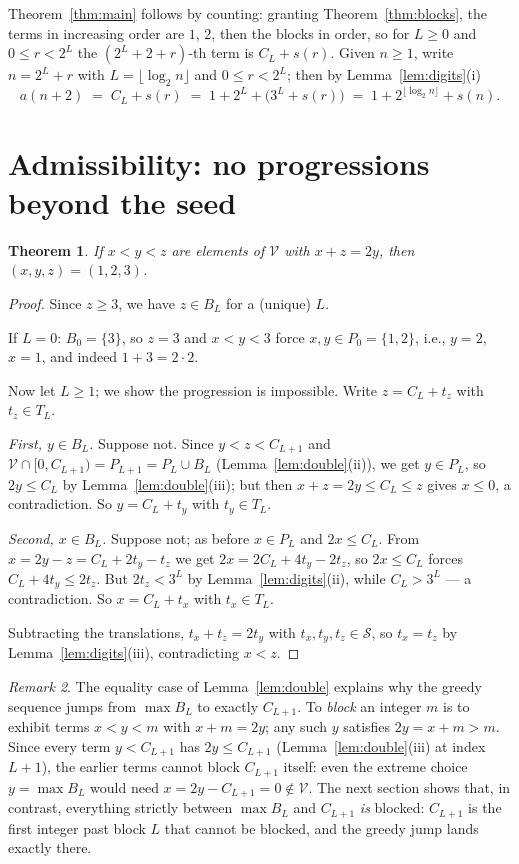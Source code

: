 \documentclass[12pt]{article}
\theoremstyle{plain}
\newtheorem{theorem}{Theorem}
\theoremstyle{definition}
\theoremstyle{remark}
\newtheorem{remark}[theorem]{Remark}
\newcommand{\V}{\mathcal{V}}
\newcommand{\Sd}{\mathcal{S}}
\begin{document}
Theorem~\ref{thm:main} follows by counting: granting
Theorem~\ref{thm:blocks}, the terms in increasing order are $1$,
$2$, then the blocks in order, so for $L\geq 0$ and
$0\leq r<2^L$ the $(2^L+2+r)$-th term is $C_L+s(r)$.  Given
$n\geq 1$, write $n=2^L+r$ with $L=\lfloor\log_2 n\rfloor$ and
$0\leq r<2^L$; then by Lemma~\ref{lem:digits}(i)
\[
a(n+2) \;=\; C_L+s(r) \;=\; 1+2^L+\bigl(3^L+s(r)\bigr)
\;=\; 1+2^{\lfloor\log_2 n\rfloor}+s(n).
\]

\section{Admissibility: no progressions beyond the seed}
\label{sec:admissible}

\begin{theorem}\label{thm:admissible}
If $x<y<z$ are elements of $\V$ with $x+z=2y$, then
$(x,y,z)=(1,2,3)$.
\end{theorem}

\begin{proof}
Since $z\geq 3$, we have $z\in B_L$ for a (unique) $L$.

If $L=0$: $B_0=\{3\}$, so $z=3$ and $x<y<3$ force
$x,y\in P_0=\{1,2\}$, i.e., $y=2$, $x=1$, and indeed
$1+3=2\cdot 2$.

Now let $L\geq 1$; we show the progression is impossible.  Write
$z=C_L+t_z$ with $t_z\in T_L$.

\emph{First, $y\in B_L$.}  Suppose not.  Since $y<z<C_{L+1}$ and
$\V\cap[0,C_{L+1})=P_{L+1}=P_L\cup B_L$
(Lemma~\ref{lem:double}(ii)), we get $y\in P_L$, so
$2y\leq C_L$ by Lemma~\ref{lem:double}(iii); but then
$x+z=2y\leq C_L\leq z$ gives $x\leq 0$, a contradiction.  So
$y=C_L+t_y$ with $t_y\in T_L$.

\emph{Second, $x\in B_L$.}  Suppose not; as before $x\in P_L$
and $2x\leq C_L$.  From $x=2y-z=C_L+2t_y-t_z$ we get
$2x=2C_L+4t_y-2t_z$, so $2x\leq C_L$ forces
$C_L+4t_y\leq 2t_z$.  But $2t_z<3^L$ by
Lemma~\ref{lem:digits}(ii), while $C_L>3^L$ --- a contradiction.
So $x=C_L+t_x$ with $t_x\in T_L$.

Subtracting the translations, $t_x+t_z=2t_y$ with
$t_x,t_y,t_z\in\Sd$, so $t_x=t_z$ by
Lemma~\ref{lem:digits}(iii), contradicting $x<z$.
\end{proof}

\begin{remark}\label{rem:landing}
The equality case of Lemma~\ref{lem:double} explains why the
greedy sequence jumps from $\max B_L$ to exactly $C_{L+1}$.  To
\emph{block} an integer $m$ is to exhibit terms $x<y<m$ with
$x+m=2y$; any such $y$ satisfies $2y=x+m>m$.  Since every term
$y<C_{L+1}$ has $2y\leq C_{L+1}$
(Lemma~\ref{lem:double}(iii) at index $L+1$), the earlier terms
cannot block $C_{L+1}$ itself: even the extreme choice
$y=\max B_L$ would need $x=2y-C_{L+1}=0\notin\V$.  The next
section shows that, in contrast, everything strictly between
$\max B_L$ and $C_{L+1}$ \emph{is} blocked: $C_{L+1}$ is the
first integer past block $L$ that cannot be blocked, and the
greedy jump lands exactly there.
\end{remark}
\end{document}
